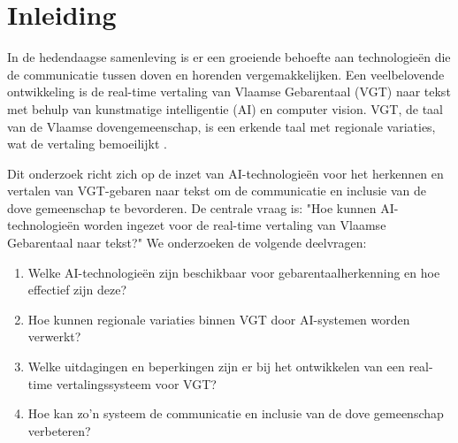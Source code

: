 


% 
\newcommand{\figref}[1]{(Zie \hyperref[#1]{figuur: \ref{#1}})}

\section{Inleiding}%
\label{sec:inleiding}

In de hedendaagse samenleving is er een groeiende behoefte aan technologieën die de communicatie tussen doven en horenden vergemakkelijken. Een veelbelovende ontwikkeling is de real-time vertaling van Vlaamse Gebarentaal (VGT) naar tekst met behulp van kunstmatige intelligentie (AI) en computer vision. VGT, de taal van de Vlaamse dovengemeenschap, is een erkende taal met regionale variaties, wat de vertaling bemoeilijkt \autocite{vanmeerbergen2000simultane}.

Dit onderzoek richt zich op de inzet van AI-technologieën voor het herkennen en vertalen van VGT-gebaren naar tekst om de communicatie en inclusie van de dove gemeenschap te bevorderen. De centrale vraag is: "Hoe kunnen AI-technologieën worden ingezet voor de real-time vertaling van Vlaamse Gebarentaal naar tekst?" We onderzoeken de volgende deelvragen:

\begin{enumerate} \item Welke AI-technologieën zijn beschikbaar voor gebarentaalherkenning en hoe effectief zijn deze? \item Hoe kunnen regionale variaties binnen VGT door AI-systemen worden verwerkt? \item Welke uitdagingen en beperkingen zijn er bij het ontwikkelen van een real-time vertalingssysteem voor VGT? \item Hoe kan zo'n systeem de communicatie en inclusie van de dove gemeenschap verbeteren? \end{enumerate}

